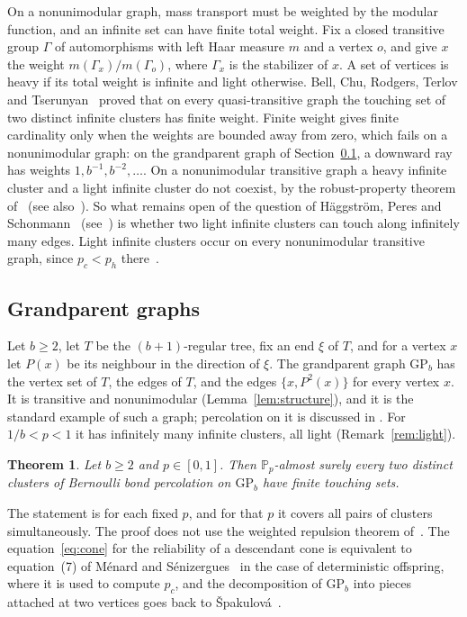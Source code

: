 \documentclass[11pt]{amsart}
\newtheorem{theorem}{Theorem}[section]
\theoremstyle{remark}
\newcommand{\PP}{\mathbb{P}}
\newcommand{\GP}{\mathrm{GP}_b}
\begin{document}
On a nonunimodular graph, mass transport must be weighted by the modular function, and an infinite set can have finite
total weight. Fix a closed transitive group $\Gamma$ of automorphisms with left Haar measure $m$ and a vertex $o$, and
give $x$ the weight $m(\Gamma_x)/m(\Gamma_o)$, where $\Gamma_x$ is the stabilizer of $x$. A set of vertices is heavy if
its total weight is infinite and light otherwise. Bell, Chu, Rodgers, Terlov and Tserunyan~\cite[Theorem~1.2]{BCRTT}
proved that on every quasi-transitive graph the touching set of two distinct infinite clusters has finite weight. Finite
weight gives finite cardinality only when the weights are bounded away from zero, which fails on a nonunimodular graph:
on the grandparent graph of Section~\ref{sec:gp}, a downward ray has weights $1,b^{-1},b^{-2},\dots$. On a nonunimodular
transitive graph a heavy infinite cluster and a light infinite cluster do not coexist, by the robust-property theorem
of~\cite[Theorem~4.1.6]{HPS99} (see also~\cite{Tang19}). So what remains open of the question of Häggström, Peres and
Schonmann~\cite{HPS99} (see~\cite[Question~1.1]{BCRTT}) is whether two light infinite clusters can touch along infinitely many edges. Light infinite clusters occur on every
nonunimodular transitive graph, since $p_c<p_h$ there~\cite{Hut20}.

\subsection{Grandparent graphs}\label{sec:gp}
Let $b\ge2$, let $T$ be the $(b+1)$-regular tree, fix an end $\xi$ of $T$, and for a vertex $x$ let $P(x)$ be its
neighbour in the direction of $\xi$. The grandparent graph $\GP$ has the vertex set of $T$, the edges of $T$, and the
edges $\{x,P^2(x)\}$ for every vertex $x$. It is transitive and nonunimodular (Lemma~\ref{lem:structure}), and it is the
standard example of such a graph; percolation on it is discussed in \cite{HPS99,Tim06b,Spa09,MS26}. For $1/b<p<1$ it has
infinitely many infinite clusters, all light (Remark~\ref{rem:light}).

\begin{theorem}\label{thm:main}
Let $b\ge2$ and $p\in[0,1]$. Then $\PP_p$-almost surely every two distinct clusters of Bernoulli bond percolation on $\GP$
have finite touching sets.
\end{theorem}

The statement is for each fixed $p$, and for that $p$ it covers all pairs of clusters simultaneously. The proof does not
use the weighted repulsion theorem of~\cite{BCRTT}. The equation~\eqref{eq:cone} for the reliability of a descendant cone
is equivalent to equation~(7) of Ménard and Sénizergues~\cite{MS26} in the case of deterministic offspring, where it is
used to compute $p_c$, and the decomposition of $\GP$ into pieces attached at two vertices goes back to
Špakulová~\cite[Section~5.3]{Spa09}.
\end{document}
